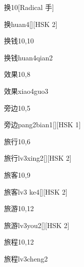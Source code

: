\begin{entry}{换}{10}[Radical 手]
  \begin{phonetics}{换}{huan4}[][HSK 2]
  \end{phonetics}
\end{entry}

\begin{entry}{换钱}{10,10}
  \begin{phonetics}{换钱}{huan4qian2}
  \end{phonetics}
\end{entry}

\begin{entry}{效果}{10,8}
  \begin{phonetics}{效果}{xiao4guo3}
  \end{phonetics}
\end{entry}

\begin{entry}{旁边}{10,5}
  \begin{phonetics}{旁边}{pang2bian1}[][HSK 1]
  \end{phonetics}
\end{entry}

\begin{entry}{旅行}{10,6}
  \begin{phonetics}{旅行}{lv3xing2}[][HSK 2]
  \end{phonetics}
\end{entry}

\begin{entry}{旅客}{10,9}
  \begin{phonetics}{旅客}{lv3 ke4}[][HSK 2]
  \end{phonetics}
\end{entry}

\begin{entry}{旅游}{10,12}
  \begin{phonetics}{旅游}{lv3you2}[][HSK 2]
  \end{phonetics}
\end{entry}

\begin{entry}{旅程}{10,12}
  \begin{phonetics}{旅程}{lv3cheng2}
  \end{phonetics}
\end{entry}

